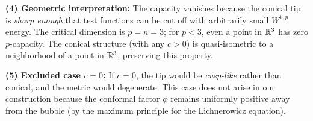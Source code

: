 \begin{remark}
\textbf{(4) Geometric interpretation:}
The capacity vanishes because the conical tip is \emph{sharp enough} that test functions can be cut off with arbitrarily small $W^{1,p}$ energy. The critical dimension is $p = n = 3$; for $p < 3$, even a point in $\mathbb{R}^3$ has zero $p$-capacity. The conical structure (with any $c > 0$) is quasi-isometric to a neighborhood of a point in $\mathbb{R}^3$, preserving this property.

\textbf{(5) Excluded case $c = 0$:}
If $c = 0$, the tip would be \emph{cusp-like} rather than conical, and the metric would degenerate. This case does not arise in our construction because the conformal factor $\phi$ remains uniformly positive away from the bubble (by the maximum principle for the Lichnerowicz equation).
\end{remark}

